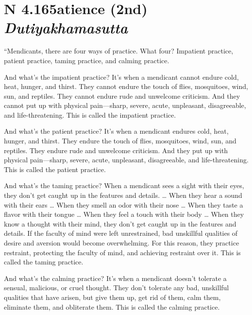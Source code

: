 \documentclass[12pt,openany]{book}%
\newcommand*{\suttatitleacronym}[1]{\smaller[2]{#1}\vspace*{.3em}}
\newcommand*{\suttatitletranslation}[1]{\linebreak{#1}}
\newcommand*{\suttatitleroot}[1]{\linebreak\smaller[2]\itshape{#1}}
\newcommand*{\tocacronym}[1]{\hspace*{-3.3em}{#1}\quad}
\newcommand*{\toctranslation}[1]{#1}
\newcommand*{\tocroot}[1]{(\textit{#1})}
\begin{document}
%
\section*{{\suttatitleacronym AN 4.165}{\suttatitletranslation Patience (2nd) }{\suttatitleroot Dutiyakhamasutta}}
\addcontentsline{toc}{section}{\tocacronym{AN 4.165} \toctranslation{Patience (2nd) } \tocroot{Dutiyakhamasutta}}

“Mendicants, there are four ways of practice. What four? Impatient practice, patient practice, taming practice, and calming practice. 

And what’s the impatient practice? It’s when a mendicant cannot endure cold, heat, hunger, and thirst. They cannot endure the touch of flies, mosquitoes, wind, sun, and reptiles. They cannot endure rude and unwelcome criticism. And they cannot put up with physical pain—sharp, severe, acute, unpleasant, disagreeable, and life-threatening. This is called the impatient practice. 

And what’s the patient practice? It’s when a mendicant endures cold, heat, hunger, and thirst. They endure the touch of flies, mosquitoes, wind, sun, and reptiles. They endure rude and unwelcome criticism. And they put up with physical pain—sharp, severe, acute, unpleasant, disagreeable, and life-threatening. This is called the patient practice. 

And what’s the taming practice? When a mendicant sees a sight with their eyes, they don’t get caught up in the features and details. … When they hear a sound with their ears … When they smell an odor with their nose … When they taste a flavor with their tongue … When they feel a touch with their body … When they know a thought with their mind, they don’t get caught up in the features and details. If the faculty of mind were left unrestrained, bad unskillful qualities of desire and aversion would become overwhelming. For this reason, they practice restraint, protecting the faculty of mind, and achieving restraint over it. This is called the taming practice. 

And what’s the calming practice? It’s when a mendicant doesn’t tolerate a sensual, malicious, or cruel thought. They don’t tolerate any bad, unskillful qualities that have arisen, but give them up, get rid of them, calm them, eliminate them, and obliterate them. This is called the calming practice. 
\end{document}
